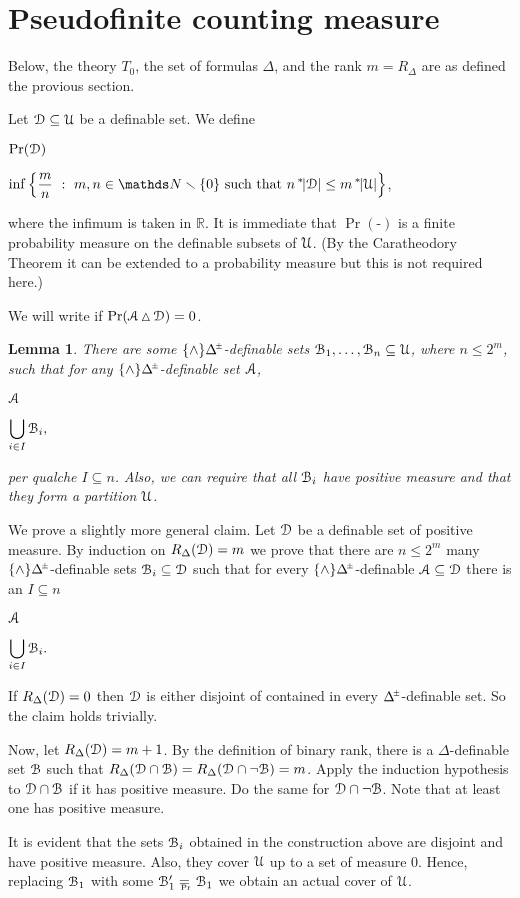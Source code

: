 \documentclass[10pt,oneside, openany]{book}
\renewcommand*{\emph}[1]{%
   \smash{\tikz[baseline]\node[rectangle, fill=green!40, rounded corners, inner xsep=0.5ex, inner ysep=0.2ex, anchor=base, minimum height = 2.7ex]{#1};}}
\def\NN{\mathds N}
\def\RR{\mathds R}
\def\pmDelta{\Delta\hskip-.3ex\raisebox{1ex}{\tiny$\pm$}}
\def\sm{\smallsetminus}
\def\simdiff{\mathop\vartriangle}
\def\D{\EuScript D}
\def\Aa{\EuScript A}
\def\U{\EuScript U}
\def\B{\EuScript B}
\newcounter{thm}[chapter]
\theoremstyle{mio}
\newtheorem{lemma}[thm]{Lemma}
\theoremstyle{liscio}
\def\QED{\noindent\nolinebreak[4]\hfill\rlap{\ \ $\Box$}\medskip}
\renewenvironment{proof}[1][Proof]%
{\smallskip\begin{trivlist}\item[\hskip\labelsep {\bf #1}]}
{\QED\end{trivlist}}
\def\ns{{}^*\kern-.3ex}
\def\eqPr{\mathrel{\raise-.6ex\rlap{\kern0.3ex\tiny Pr}\raise.1ex\hbox{$=$\,} }}
\begin{document}
\section{Pseudofinite counting measure}

\def\ceq#1#2#3{\parbox[t]{20ex}{$\displaystyle #1$}\medrel{#2}$\displaystyle  #3$}

Below, the theory $T_0$, the set of formulas $\Delta$, and the rank $m=R_\Delta$ are as defined the provious section.

Let $\D\subseteq\U$ be a definable set.
%
We define

\ceq{\hfill\Pr(\D)}
{=}
{\inf\Big\{\frac{m}{n}\ :\ m,n\in\NN\sm\{0\} \text{ such that } n\,\ns|\D|\le m\,\ns|\U|\Big\}},

where the infimum is taken in $\RR$.
%
It is immediate that $\Pr(\mbox{-})$ is a finite probability measure on the definable subsets of $\U$.
%
(By the Caratheodory Theorem it can be extended to a probability measure but this is not required here.)

We will write \emph{$\Aa\eqPr\D$} if $\Pr(\Aa\simdiff\D)=0$.

\begin{lemma}\label{lem_atoms}
  There are some $\{\wedge\}\pmDelta$-definable sets $\B_1,\dots,\B_n\subseteq\U$, where $n\le2^m$, such that for any $\{\wedge\}\pmDelta$-definable set $\Aa$, 
  
  \ceq{\hfill\Aa}{\eqPr}{\bigcup_{i\in I}\B_i,}

  per qualche $I\subseteq n$.
  Also, we can require that all $\B_i$ have positive measure and that they form a partition $\U$.
\end{lemma}

\begin{proof}
  We prove a slightly more general claim.
  Let $\D$ be a definable set of positive measure.
  By induction on $R_\Delta(\D)=m$ we prove that there are $n\le 2^m$ many $\{\wedge\}\pmDelta$-definable sets $\B_i\subseteq\D$ such that for every $\{\wedge\}\pmDelta$-definable $\Aa\subseteq\D$ there is an $I\subseteq n$

  \ceq{\hfill\Aa}{\eqPr}{\bigcup_{i\in I}\B_i.}

  If  $R_\Delta(\D)=0$ then $\D$ is either disjoint of contained in every $\pmDelta$-definable set.
  So the claim holds trivially.

  Now, let $R_\Delta(\D)=m+1$.
  By the definition of binary rank, there is a $\Delta$-definable set $\B$ such that $R_\Delta(\D\cap\B)=R_\Delta(\D\cap\neg\B)=m$.
  Apply the induction hypothesis to $\D\cap\B$ if it has positive measure. 
  Do the same for $\D\cap\neg\B$.
  Note that at least one has positive measure.

  It is evident that the sets $\B_i$ obtained in the construction above are disjoint and have positive measure.
  Also, they cover $\U$ up to a set of measure $0$.
  Hence, replacing $\B_1$ with some $\B'_1\eqPr\B_1$ we obtain an actual cover of $\U$.
\end{proof}
\end{document}
